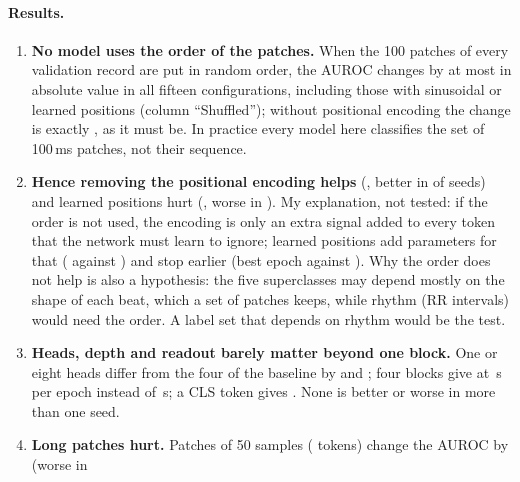 \paragraph{Results.}
\begin{enumerate}[leftmargin=1.4em,itemsep=2pt]
  \item \textbf{No model uses the order of the patches.} When the 100 patches of every validation record
        are put in random order, the AUROC changes by at most \transformerOrderDropLayersFour{} in
        absolute value in all fifteen configurations, including those with sinusoidal or learned
        positions (column ``Shuffled''); without positional encoding the change is exactly
        \transformerOrderDropNoPos{}, as it must be. In practice every model here classifies the set of
        100\,ms patches, not their sequence.
  \item \textbf{Hence removing the positional encoding helps} (\transformerDiffMeanNoPos{}, better in
        \transformerNSeedsBetterNoPos{} of \transformerNSeedsComparedNoPos{} seeds) and learned positions
        hurt (\transformerDiffMeanLearnedPos{}, worse in \transformerNSeedsWorseLearnedPos{}). My
        explanation, not tested: if the order is not used, the encoding is only an extra signal added to
        every token that the network must learn to ignore; learned positions add parameters for that
        (\transformerParamsLearnedPos{} against \transformerParamsBase{}) and stop earlier (best epoch
        \onedec{\transformerBestEpochMeanLearnedPos} against \onedec{\transformerBestEpochMeanBase}). Why
        the order does not help is also a hypothesis: the five superclasses may depend mostly on the shape
        of each beat, which a set of patches keeps, while rhythm (RR intervals) would need the order. A
        label set that depends on rhythm would be the test.
  \item \textbf{Heads, depth and readout barely matter beyond one block.} One or eight heads differ
        from the four of the baseline by \transformerDiffMeanHeadsOne{} and \transformerDiffMeanHeadsEight{}; four blocks give
        \transformerDiffMeanLayersFour{} at \onedec{\transformerEpochTimeMeanLayersFour}\,s per epoch
        instead of \onedec{\transformerEpochTimeMeanBase}\,s; a CLS token gives \transformerDiffMeanCls{}.
        None is better or worse in more than one seed.
  \item \textbf{Long patches hurt.} Patches of 50 samples (\transformerTokensPatchFiveZero{} tokens)
        change the AUROC by \transformerDiffMeanPatchFiveZero{} (worse in

\end{enumerate}

